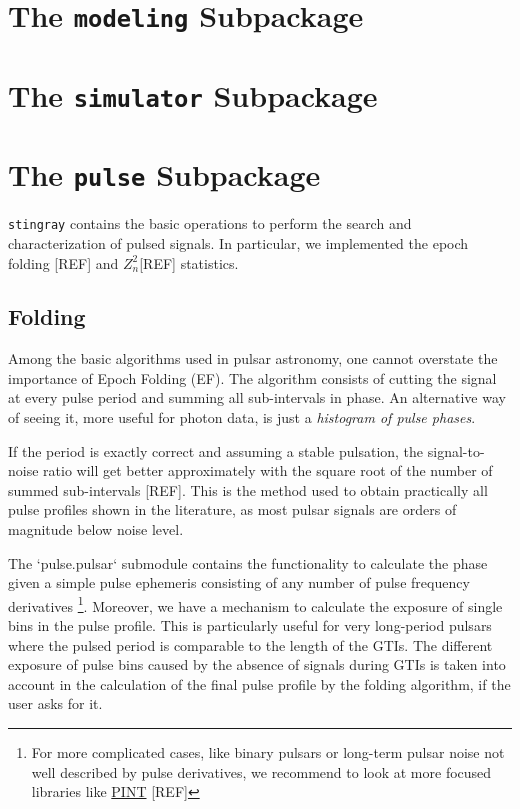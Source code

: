 \documentclass[12pt]{emulateapj}
\newcommand{\zsq}{\ensuremath{Z^2_n}}
\newcommand{\stingray}{\texttt{stingray}\xspace}
\begin{document}
\section{The \texttt{modeling} Subpackage}
\label{sec:modeling}

\section{The \texttt{simulator} Subpackage}
\label{sec:simulator}

\section{The \texttt{pulse} Subpackage}
\label{sec:pulsar}
\stingray contains the basic operations to perform the search and characterization of pulsed signals.
In particular, we implemented the epoch folding [REF] and \zsq [REF] statistics.

\subsection{Folding}
Among the basic algorithms used in pulsar astronomy, one cannot overstate the importance of Epoch Folding (EF).
The algorithm consists of cutting the signal at every pulse period and summing all sub-intervals in phase. 
An alternative way of seeing it, more useful for photon data, is just a \textit {histogram of pulse phases}.

If the period is exactly correct and assuming a stable pulsation, the signal-to-noise ratio will get better approximately with the square root of the number of summed sub-intervals [REF].
This is the method used to obtain practically all pulse profiles shown in the literature, as most pulsar signals are orders of magnitude below noise level.

The `pulse.pulsar` submodule contains the functionality to calculate the phase given a simple pulse ephemeris consisting of any number of pulse frequency derivatives%
\footnote{For more complicated cases, like binary pulsars or long-term pulsar noise not well described by pulse derivatives, we recommend to look at more focused libraries like \href{https://github.com/nanograv/PINT}{PINT} [REF]}.
Moreover, we have a mechanism to calculate the exposure of single bins in the pulse profile. 
This is particularly useful for very long-period pulsars where the pulsed period is comparable to the length of the GTIs.
The different exposure of pulse bins caused by the absence of signals during GTIs is taken into account in the calculation of the final pulse profile by the folding algorithm, if the user asks for it. 
\end{document}

